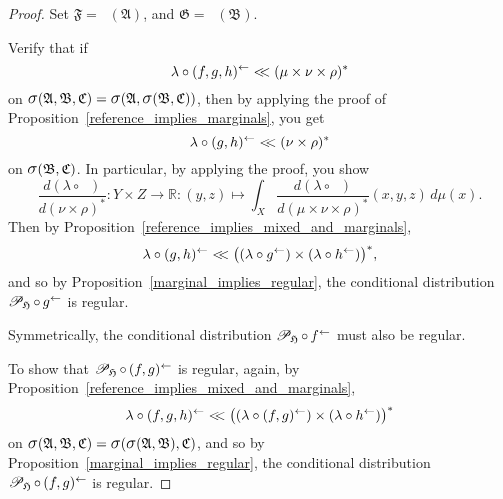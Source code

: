 \documentclass[
twoside=true,
paper=letter,
fontsize=9pt,
pagesize=auto,
leqno,
openany,
headsepline,
overfullrule,
]{scrbook}
\theoremstyle{plain}
\theoremstyle{plain}
\theoremstyle{definition}
\theoremstyle{bfnoteitalic}
\theoremstyle{bfnoteroman}
\newcommand{\sigalg}[1]{\mathfrak{#1}}
\newcommand{\cali}[1]{\mathscr{#1}}
\newcommand{\condprobop}[1]{\mathop{\cali{P}\hspace{-1pt}}\nolimits_{#1}}
\newcommand{\sagb}{\mathop{\hbox{\large{$\sigma$}}}\nolimits}
\newcommand{\preimage}[1]{\mathop{#1^{\leftarrow}}}
\newcommand{\R}{\mathbb{R}}
\newcommand{\sigmaalgebra}{\sigalg{A}}
\newcommand{\sigmaalgebraii}{\sigalg{B}}
\newcommand{\sigmaalgebraiii}{\sigalg{C}}
\newcommand{\productsig}[2]{\sagb(#1,#2)}
\newcommand{\funcf}{f}
\newcommand{\funcg}{g}
\newcommand{\funch}{h}
\newcommand{\function}{f}
\newcommand{\functionii}{g}
\newcommand{\functioniii}{h}
\newcommand{\measurespace}{X}
\newcommand{\measurespaceii}{Y}
\newcommand{\measurespaceiii}{Z}
\newcommand{\mspaceelt}{x}
\newcommand{\mspaceeltii}{y}
\newcommand{\mspaceeltiii}{z}
\newcommand{\abscont}{\mathrel{< \kern-3.5pt <}}
\newcommand{\measmu}{\mu}
\newcommand{\measnu}{\nu}
\newcommand{\measlambda}{\lambda}
\newcommand{\measrho}{\rho}
\begin{document}
\begin{proof}
Set
$\sigalg{F}=\preimage{\funcf}(\sigmaalgebra)$,
and $\sigalg{G}=\preimage{\funcg}(\sigmaalgebraii)$.


Verify that if
\[
\measlambda\circ\preimage{(\function,\functionii,\functioniii)}
\abscont
(\measmu\times\measnu\times\measrho)^*
\]
on
$\productsig{\sigmaalgebra}{\sigmaalgebraii,\sigmaalgebraiii}
=
\productsig{\sigmaalgebra}{\productsig{\sigmaalgebraii}{\sigmaalgebraiii}}$,
then by applying the proof of Proposition~\ref{reference_implies_marginals}, you get
\[
\measlambda\circ \preimage{(\funcg,\funch)}
\abscont
(\measnu\times\measrho)^*
\]
on
$\productsig{\sigmaalgebraii}{\sigmaalgebraiii}$.
In particular, by applying the proof, you show
\[
\frac{d(\measlambda\circ \preimage{(\funcg,\funch)})}{d(\measnu\times\measrho)^*}
:\measurespaceii\times\measurespaceiii \to  \R
:(\mspaceeltii,\mspaceeltiii)\mapsto
\int_\measurespace
\frac{d(\measlambda\circ\preimage{(\function,\functionii,\functioniii)})}
{d(\measmu\times\measnu\times\measrho)^*}
(\mspaceelt,\mspaceeltii,\mspaceeltiii)\,d\measmu(\mspaceelt).
\]
Then by Proposition~\ref{reference_implies_mixed_and_marginals},
\[
\measlambda\circ \preimage{(\funcg,\funch)}
\abscont
\bigl((\measlambda\circ\preimage{\funcg})
\times
(\measlambda\circ\preimage{\funch})\bigr)^*,
\]
and so by Proposition~\ref{marginal_implies_regular},
the conditional distribution
$\condprobop{\sigalg{H}}\circ \preimage{\funcg}$
is regular.

Symmetrically, the conditional distribution
$\condprobop{\sigalg{H}}\circ \preimage{\funcf}$
must also be regular.

To show that
$\condprobop{\sigalg{H}} \circ \preimage{(\funcf,\funcg)}$
is regular, again, by Proposition~\ref{reference_implies_mixed_and_marginals},
\[
\measlambda\circ \preimage{(\funcf, \funcg, \funch)}
\abscont
\bigl((\measlambda\circ\preimage{(\funcf,\funcg)})
\times
(\measlambda\circ\preimage{\funch})\bigr)^*
\]
on
$\productsig{\sigmaalgebra}{\sigmaalgebraii,\sigmaalgebraiii}
=
\productsig{\productsig{\sigmaalgebra}{\sigmaalgebraii}}{\sigmaalgebraiii}$,
and so by Proposition~\ref{marginal_implies_regular},
the conditional distribution
$\condprobop{\sigalg{H}}\circ \preimage{(\funcf,\funcg)}$
is regular.
\end{proof}
\end{document}
